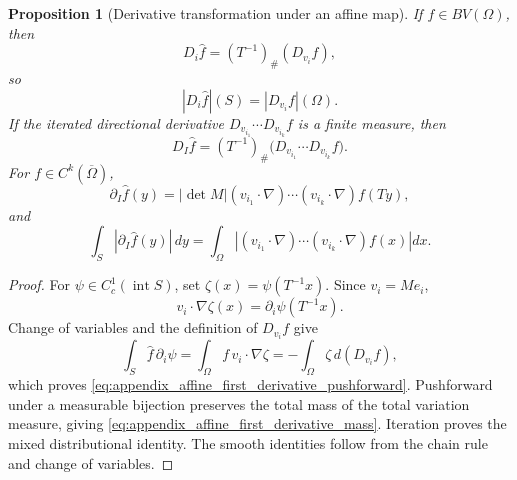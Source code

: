 \documentclass[11pt,letterpaper]{article}
\newtheorem{proposition}[theorem]{Proposition}
\theoremstyle{definition}
\theoremstyle{remark}
\begin{document}
\begin{proposition}[Derivative transformation under an affine map]
\label{prop:appendix_affine_derivative_transformation}
If $f\in BV(\Omega)$, then
\begin{equation}
\label{eq:appendix_affine_first_derivative_pushforward}
D_i\widehat f=(T^{-1})_\#(D_{v_i}f),
\end{equation}
so
\begin{equation}
\label{eq:appendix_affine_first_derivative_mass}
|D_i\widehat f|(S)=|D_{v_i}f|(\Omega).
\end{equation}
If the iterated directional derivative
$D_{v_{i_1}}\cdots D_{v_{i_k}}f$ is a finite measure, then
\begin{equation}
\label{eq:appendix_affine_mixed_derivative_pushforward}
D_I\widehat f
=
(T^{-1})_\#
\bigl(D_{v_{i_1}}\cdots D_{v_{i_k}}f\bigr).
\end{equation}
For $f\in C^k(\overline\Omega)$,
\begin{equation}
\label{eq:appendix_affine_mixed_derivative_pointwise}
\partial_I\widehat f(y)
=
|\det M|
(v_{i_1}\cdot\nabla)\cdots(v_{i_k}\cdot\nabla)f(Ty),
\end{equation}
and
\begin{equation}
\label{eq:appendix_affine_mixed_derivative_mass}
\int_S|\partial_I\widehat f(y)|\,dy
=
\int_\Omega
\left|
(v_{i_1}\cdot\nabla)\cdots(v_{i_k}\cdot\nabla)f(x)
\right|dx.
\end{equation}
\end{proposition}

\begin{proof}
For $\psi\in C_c^1(\operatorname{int}S)$, set
$\zeta(x)=\psi(T^{-1}x)$. Since $v_i=Me_i$,
$$
v_i\cdot\nabla\zeta(x)
=
\partial_i\psi(T^{-1}x).
$$
Change of variables and the definition of $D_{v_i}f$ give
$$
\int_S\widehat f\,\partial_i\psi
=
\int_\Omega f\,v_i\cdot\nabla\zeta
=
-\int_\Omega\zeta\,d(D_{v_i}f),
$$
which proves \eqref{eq:appendix_affine_first_derivative_pushforward}.
Pushforward under a measurable bijection preserves the total mass of the total
variation measure, giving
\eqref{eq:appendix_affine_first_derivative_mass}. Iteration proves the mixed
distributional identity. The smooth identities follow from the chain rule and
change of variables.
\end{proof}
\end{document}
